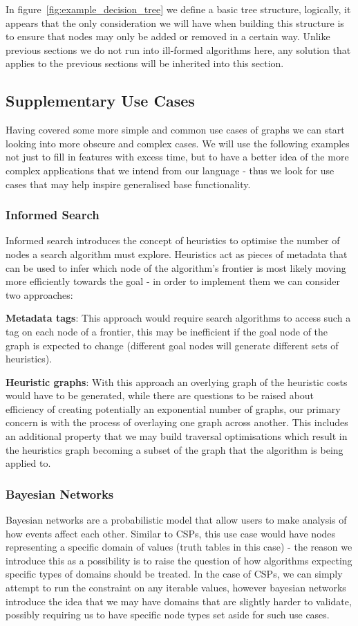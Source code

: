 In figure~\ref{fig:example_decision_tree} we define a basic tree structure, logically, it appears that the only
consideration we will have when building this structure is to ensure that nodes may only be added or removed in a
certain way.
Unlike previous sections we do not run into ill-formed algorithms here, any solution that applies to the previous
sections will be inherited into this section.

\subsection{Supplementary Use Cases}\label{subsec:supplementary-use-cases}
Having covered some more simple and common use cases of graphs we can start looking into more obscure and complex
cases.
We will use the following examples not just to fill in features with excess time, but to have a better idea of the
more complex applications that we intend from our language - thus we look for use cases that may help inspire
generalised base functionality.

\subsubsection{Informed Search}
Informed search introduces the concept of heuristics to optimise the number of nodes a search algorithm must explore.
Heuristics act as pieces of metadata that can be used to infer which node of the algorithm's frontier is most likely 
moving more efficiently towards the goal - in order to implement them we can consider two approaches:

\textbf{Metadata tags}: This approach would require search algorithms to access such a tag on each node of a frontier,
this may be inefficient if the goal node of the graph is expected to change (different goal nodes will generate
different sets of heuristics).

\textbf{Heuristic graphs}: With this approach an overlying graph of the heuristic costs would have to be generated,
while there are questions to be raised about efficiency of creating potentially an exponential number of graphs, our
primary concern is with the process of overlaying one graph across another.
This includes an additional property that we may build traversal optimisations which result in the heuristics graph
becoming a subset of the graph that the algorithm is being applied to.

\subsubsection{Bayesian Networks}
Bayesian networks are a probabilistic model that allow users to make analysis of how events affect each other.
Similar to CSPs, this use case would have nodes representing a specific domain of values (truth tables in this case) -
the reason we introduce this as a possibility is to raise the question of how algorithms expecting specific types of
domains should be treated.
In the case of CSPs, we can simply attempt to run the constraint on any iterable values, however bayesian networks
introduce the idea that we may have domains that are slightly harder to validate, possibly requiring us to have
specific node types set aside for such use cases.


